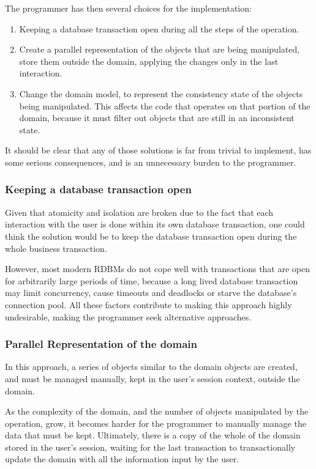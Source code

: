 \documentclass{llncs}
\begin{document}
The programmer has then several choices for the implementation:

\begin{enumerate}
\item Keeping a database transaction open during all the steps of the
  operation.

\item Create a parallel representation of the objects that are being
  manipulated, store them outside the domain, applying the changes
  only in the last interaction.

\item Change the domain model, to represent the consistency state of
  the objects being manipulated. This affects the code that operates
  on that portion of the domain, because it must filter out objects
  that are still in an inconsistent state.
\end{enumerate}

It should be clear that any of those solutions is far from trivial to
implement, has some serious consequences, and is an unnecessary burden
to the programmer.

\subsubsection{Keeping a database transaction open}

Given that atomicity and isolation are broken due to the fact that
each interaction with the user is done within its own database
transaction, one could think the solution would be to keep the
database transaction open during the whole business transaction.

However, most modern RDBMs do not cope well with transactions that are
open for arbitrarily large periods of time, because a long lived
database transaction may limit concurrency, cause timeouts and
deadlocks or starve the database's connection pool. All these factors
contribute to making this approach highly undesirable, making the
programmer seek alternative approaches.

\subsubsection{Parallel Representation of the domain}

In this approach, a series of objects similar to the domain objects
are created, and must be managed manually, kept in the user's session
context, outside the domain.

As the complexity of the domain, and the number of objects manipulated
by the operation, grow, it becomes harder for the programmer to
manually manage the data that must be kept. Ultimately, there is a
copy of the whole of the domain stored in the user's session, waiting
for the last transaction to transactionally update the domain with all
the information input by the user.
\end{document}
